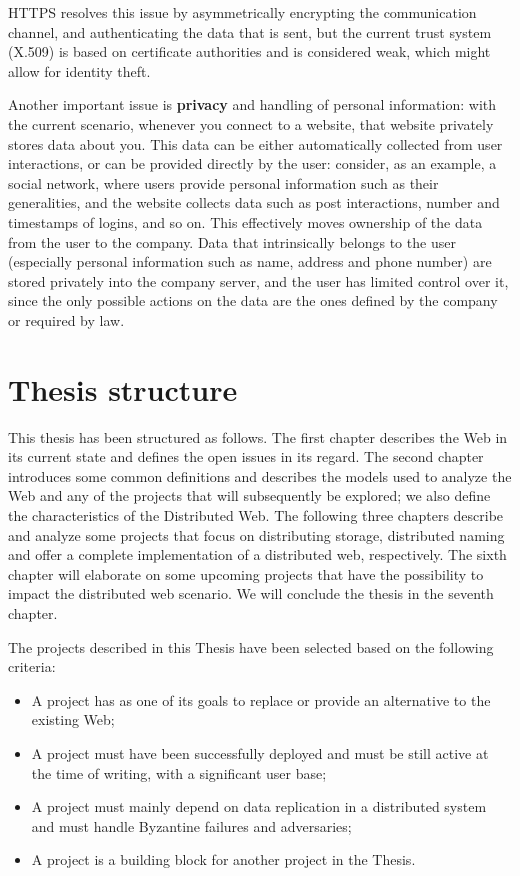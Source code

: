 \documentclass[mscthesis]{usiinfthesis}
\begin{document}
HTTPS resolves this issue by asymmetrically encrypting the communication channel, and authenticating the data that is sent, but the current trust system (X.509) is based on certificate authorities and is considered weak, which might allow for identity theft. %

Another important issue is \textbf{privacy} and handling of personal information: with the current scenario, whenever you connect to a website, that website privately stores data about you.
This data can be either automatically collected from user interactions, or can be provided directly by the user: consider, as an example, a social network, where users provide personal information such as their generalities, and the website collects data such as post interactions, number and timestamps of logins, and so on.
This effectively moves ownership of the data from the user to the company. Data that intrinsically belongs to the user (especially personal information such as name, address and phone number) are stored privately into the company server, and the user has limited control over it, since the only possible actions on the data are the ones defined by the company or required by law.

\section{Thesis structure}
This thesis has been structured as follows. The first chapter describes the Web in its current state and defines the open issues in its regard. The second chapter introduces some common definitions and describes the models used to analyze the Web and any of the projects that will subsequently be explored; we also define the characteristics of the Distributed Web. The following three chapters describe and analyze some projects that focus on distributing storage, distributed naming and offer a complete implementation of a distributed web, respectively. The sixth chapter will elaborate on some upcoming projects that have the possibility to impact the distributed web scenario. We will conclude the thesis in the seventh chapter.

The projects described in this Thesis have been selected based on the following criteria:
\begin{itemize}
	\item A project has as one of its goals to replace or provide an alternative to the existing Web;
	\item A project must have been successfully deployed and must be still active at the time of writing, with a significant user base;
	\item A project must mainly depend on data replication in a distributed system and must handle Byzantine failures and adversaries;
	\item A project is a building block for another project in the Thesis.
\end{itemize}
\end{document}
